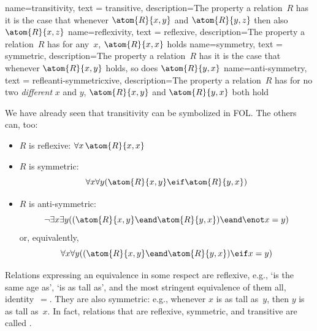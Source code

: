 
{
  name=transitivity,
  text = transitive,
  description={The property a relation~$R$ has \ifeff{} it is the case
  that whenever $\atom{R}{x,y}$ and $\atom{R}{y,z}$ then also~$\atom{R}{x,z}$}
}
{
  name=reflexivity,
  text = reflexive,
  description={The property a relation~$R$ has \ifeff{} for any~$x$, $\atom{R}{x,x}$ holds}
}
{
  name=symmetry,
  text = symmetric,
  description={The property a relation~$R$ has \ifeff{} it is the case
  that whenever $\atom{R}{x,y}$ holds, so does $\atom{R}{y,x}$}
}
{
  name=anti-symmetry,
  text = refleanti-symmetricxive,
  description={The property a relation~$R$ has \ifeff{} for no two
	\emph{different} $x$ and $y$, $\atom{R}{x,y}$ and $\atom{R}{y,x}$
	both hold}
}

We have already seen that transitivity can be symbolized in FOL. The
others can, too:
\begin{itemize}
	\item $R$ is reflexive: $\forall x\,\atom{R}{x,x}$
	\item $R$ is symmetric: \[\forall x\forall y(\atom{R}{x,y} \eif \atom{R}{y,x})\]
	\item $R$ is anti-symmetric: \[\lnot\exists x\exists y((\atom{R}{x,y}
	\eand \atom{R}{y,x}) \eand \enot x=y)\] or, equivalently, \[\forall x\forall y((\atom{R}{x,y}
	\eand \atom{R}{y,x}) \eif x=y)\]
\end{itemize}

Relations expressing an equivalence in some respect are reflexive,
e.g., `is the same age as', `is as tall as', and the most stringent
equivalence of them all, identity~$=$. They are also symmetric: e.g.,
whenever $x$ is as tall as~$y$, then $y$ is as tall as~$x$. In fact,
relations that are reflexive, symmetric, and transitive are called
.

